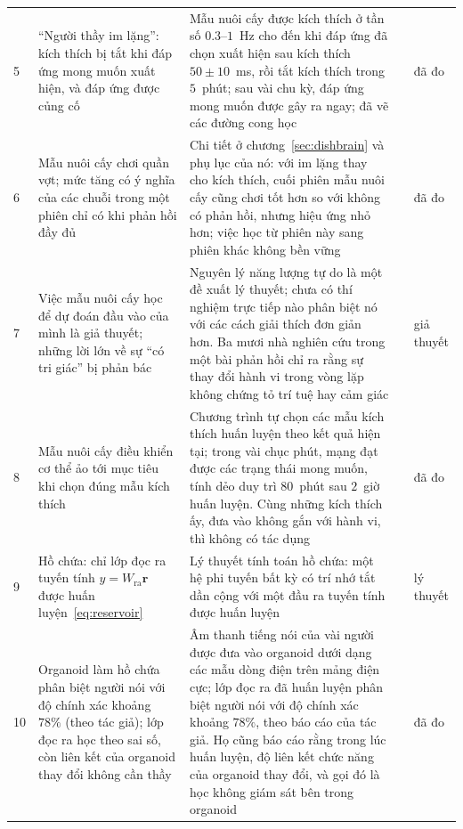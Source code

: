{\begin{longtable}{>{\raggedright}p{0.5cm}>{\raggedright}p{4.0cm}>{\raggedright}p{5.6cm}>{\raggedright}p{2.3cm}>{\raggedright\arraybackslash}p{1.7cm}}
5 & ``Người thầy im lặng'': kích thích bị tắt khi đáp ứng mong muốn xuất hiện, và đáp ứng được củng cố & Mẫu nuôi cấy được kích thích ở tần số $0.3$--$1$~Hz cho đến khi đáp ứng đã chọn xuất hiện sau kích thích $50\pm10$~ms, rồi tắt kích thích trong $5$~phút; sau vài chu kỳ, đáp ứng mong muốn được gây ra ngay; đã vẽ các đường cong học & \cite{Shahaf2001} & đã đo \\
6 & Mẫu nuôi cấy chơi quần vợt; mức tăng có ý nghĩa của các chuỗi trong một phiên chỉ có khi phản hồi đầy đủ & Chi tiết ở chương~\ref{sec:dishbrain} và phụ lục của nó: với im lặng thay cho kích thích, cuối phiên mẫu nuôi cấy cũng chơi tốt hơn so với không có phản hồi, nhưng hiệu ứng nhỏ hơn; việc học từ phiên này sang phiên khác không bền vững & \cite{Kagan2022} & đã đo \\
7 & Việc mẫu nuôi cấy học để dự đoán đầu vào của mình là giả thuyết; những lời lớn về sự ``có tri giác'' bị phản bác & Nguyên lý năng lượng tự do là một đề xuất lý thuyết; chưa có thí nghiệm trực tiếp nào phân biệt nó với các cách giải thích đơn giản hơn. Ba mươi nhà nghiên cứu trong một bài phản hồi chỉ ra rằng sự thay đổi hành vi trong vòng lặp không chứng tỏ trí tuệ hay cảm giác & \cite{Friston2010,Balci2023} & giả thuyết \\
8 & Mẫu nuôi cấy điều khiển cơ thể ảo tới mục tiêu khi chọn đúng mẫu kích thích & Chương trình tự chọn các mẫu kích thích huấn luyện theo kết quả hiện tại; trong vài chục phút, mạng đạt được các trạng thái mong muốn, tính dẻo duy trì $80$~phút sau $2$~giờ huấn luyện. Cùng những kích thích ấy, đưa vào không gắn với hành vi, thì không có tác dụng & \cite{Bakkum2008} & đã đo \\
9 & Hồ chứa: chỉ lớp đọc ra tuyến tính $y=W_{\text{ra}}\mathbf r$ được huấn luyện~\eqref{eq:reservoir} & Lý thuyết tính toán hồ chứa: một hệ phi tuyến bất kỳ có trí nhớ tắt dần cộng với một đầu ra tuyến tính được huấn luyện & \cite{Maass2002,JaegerHaas2004} & lý thuyết \\
10 & Organoid làm hồ chứa phân biệt người nói với độ chính xác khoảng $78\%$ (theo tác giả); lớp đọc ra học theo sai số, còn liên kết của organoid thay đổi không cần thầy & Âm thanh tiếng nói của vài người được đưa vào organoid dưới dạng các mẫu dòng điện trên mảng điện cực; lớp đọc ra đã huấn luyện phân biệt người nói với độ chính xác khoảng $78\%$, theo báo cáo của tác giả. Họ cũng báo cáo rằng trong lúc huấn luyện, độ liên kết chức năng của organoid thay đổi, và gọi đó là học không giám sát bên trong organoid & \cite{Cai2023} & đã đo \\

\end{longtable}}
